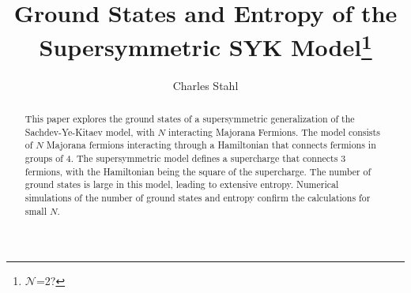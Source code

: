 \documentclass[12pt]{article} %
\renewcommand{\cal}{\mathcal}
\begin{document}
\title{\textbf{Ground States and Entropy of the Supersymmetric SYK Model\footnote{$\cal N$=2?}}}
\author{Charles Stahl}

\maketitle

\begin{abstract}
	This paper explores the ground states of a supersymmetric generalization of the Sachdev-Ye-Kitaev model, with $N$ interacting Majorana Fermions. The model consists of $N$ Majorana fermions interacting through a Hamiltonian that connects fermions in groups of 4. The supersymmetric model defines a supercharge that connects 3 fermions, with the Hamiltonian being the square of the supercharge. The number of ground states is large in this model, leading to extensive entropy. Numerical simulations of the number of ground states and entropy confirm the calculations for small $N$. 
\end{abstract}

\tableofcontents
\newpage
\end{document}
